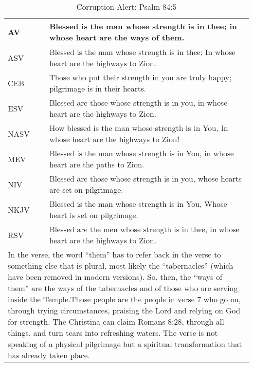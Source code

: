 \begin{center}

\begin{table}[ht]
\centering
\begin{tabular}{|p{.5in}|p{3.5in}|}
\hline

\textcolor[rgb]{0.00,0.00,1.00}{AV} & \textcolor[rgb]{0.00,0.00,1.00}{Blessed is the man whose strength is in thee; in whose heart are the ways of them.} \\ \hline 

\hline
\hline


ASV &  Blessed is the man whose strength is in thee; In whose heart are the highways to Zion. \\ \hline
%
CEB & Those who put their strength in you are truly happy; pilgrimage is in their hearts.\\ \hline
%
ESV & Blessed are those whose strength is in you, in whose heart are the highways to Zion. \\ \hline
%
NASV & How blessed is the man whose strength is in You, In whose heart are the highways to Zion! \\ \hline
%
MEV & Blessed is the man whose strength is in You, in whose heart are the paths to Zion.\\ \hline
%
NIV & Blessed are those whose strength is in you, whose hearts are set on pilgrimage. \\ \hline
%
NKJV &  Blessed is the man whose strength is in You, Whose heart is set on pilgrimage.\\ \hline
%
RSV &  Blessed are the men whose strength is in thee, in whose heart are the highways to Zion. \\ \hline

\hline
\hline

\multicolumn{2}{|p{4.3in}|}{{\textcolor{jungle}{In the verse, the word ``them'' has to refer back in the verse to something else that is plural, most likely the ``tabernacles'' (which have been removed in modern versions). So, then, the ``ways of them'' are the ways of the tabernacles and of those who are serving inside the Temple.Those people are the people in verse 7 who go on, through trying circumstances, praising the Lord and relying on God for strength. The Christina can claim Romans 8:28, through all things, and turn tears into refreshing waters. The verse is not speaking of a physical pilgrimage but a spiritual transformation that has already taken place. \cite{Ruckman1992PsalmsV2}}}} \\ \hline

\end{tabular}
\caption[Corruption Alert: Psalm 84:5]{Corruption Alert: Psalm 84:5} \label{table:Corruption Psalm 84:5}

\end{table}

\end{center}
